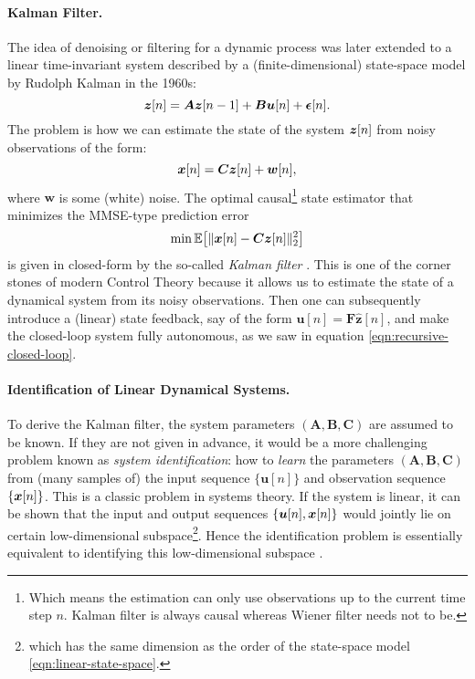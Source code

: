 \documentclass[\toplevelprefix/book-main.tex]{subfiles}
\begin{document}
\paragraph{Kalman Filter.} 
The idea of denoising or filtering for a dynamic process was later extended to a linear time-invariant system described by a (finite-dimensional) state-space model by Rudolph Kalman in the 1960s:
\begin{equation}
    \bm{z}[n] = \boldsymbol{A} \bm{z}[n-1] + \boldsymbol{B}\boldsymbol{u}[n] + \boldsymbol{\epsilon}[n]. 
    \label{eqn:linear-state-space}
\end{equation}
The problem is how we can estimate the state of the system $\bm{z}[n]$ from noisy observations of the form: \begin{equation}\bm{x}[n] = \boldsymbol{C} \bm{z}[n] + \boldsymbol{w}[n],
\label{eqn:Kalman-model}
\end{equation}
where $\boldsymbol{w}$ is some (white) noise. The optimal causal\footnote{Which means the estimation can only use observations up to the current  time step $n$. Kalman filter is always causal whereas Wiener filter needs not to be.} state  estimator that minimizes the MMSE-type prediction error
\begin{equation}
    \min \mathbb{E}\big[ \|\bm{x}[n] - \boldsymbol{C}\bm{z}[n]\|_2^2\big]
\end{equation}
is given in closed-form by the so-called {\em Kalman filter} \cite{kalman1960new}. This is one of the corner stones of modern Control Theory because it allows us to estimate the state of a dynamical system from its noisy observations. Then one can subsequently introduce a (linear) state feedback, say of the form $\boldsymbol{u}[n] = \boldsymbol{F} \hat{\boldsymbol{z}}[n]$, and make the closed-loop system fully autonomous, as we saw in equation \eqref{eqn:recursive-closed-loop}. 

\paragraph{Identification of Linear Dynamical Systems.}
To derive the Kalman filter, the system parameters $(\boldsymbol{A}, \boldsymbol{B}, \boldsymbol{C})$ are assumed to be known. If they are not given in advance, it would be a more challenging problem known as {\em system identification}: how to {\em learn} the parameters $(\boldsymbol{A}, \boldsymbol{B}, \boldsymbol{C})$ from (many samples of) the input sequence $\{\boldsymbol{u}[n]\}$ and observation sequence $\{\bm{x}[n]\}$. This is a classic problem in systems theory. If the system is linear, it can be shown that the input and output sequences $\{\boldsymbol{u}[n], \bm{x}[n]\}$ would jointly lie on certain low-dimensional subspace\footnote{which has the same dimension as the order of the state-space model \eqref{eqn:linear-state-space}. }. Hence the identification problem is essentially equivalent to identifying this low-dimensional subspace \cite{OverscheeP1996,Liu-2009-CDC,Liu-2010-SIAM}. 
\end{document}
